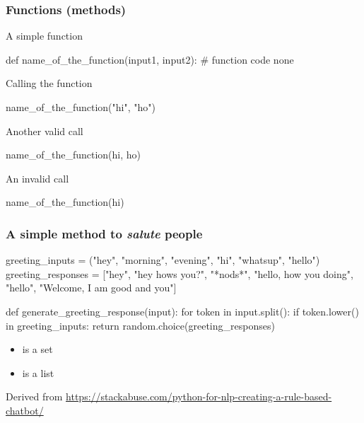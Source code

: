 \documentclass{beamer}
\begin{document}
\begin{frame}[fragile]
\frametitle{Functions (methods)}

A simple function
\begin{python}
  def name_of_the_function(input1, input2):
      # function code
      none
\end{python}
\pause

Calling the function
\begin{python}
name_of_the_function("hi", "ho")
\end{python}
\pause

Another valid call
\begin{python}
name_of_the_function(hi, ho)
\end{python}
\pause

An invalid call
\begin{python}
name_of_the_function(hi)
\end{python}

\end{frame}


\begin{frame}[fragile]
\frametitle{A simple method to \textit{salute} people}
\vspace{5mm}

\begin{python}
greeting_inputs = ("hey", "morning", "evening", "hi",
                "whatsup", "hello")
greeting_responses = ["hey", "hey hows you?", "*nods*",
                "hello, how you doing", "hello",
                "Welcome, I am good and you"]

def generate_greeting_response(input):
    for token in input.split():
        if token.lower() in greeting_inputs:
            return random.choice(greeting_responses)
\end{python}
\pause

\begin{itemize}
 \item {} is a \alert{set}
 \item {} is a \alert{list}
\end{itemize}

\onslide
\footnotesize
Derived from
\url{https://stackabuse.com/python-for-nlp-creating-a-rule-based-chatbot/}
\end{frame}
\end{document}
